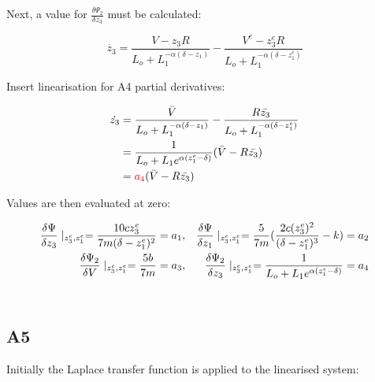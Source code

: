 \documentclass[a4paper,10pt,reqno]{amsart}
\numberwithin{equation}{section}
\begin{document}
\par Next, a value for $\frac{\delta\Psi_2}{\delta z_3}$ must be calculated:

\begin{equation}
    \dot{z_3}=\frac{V-z_3R}{L_o+L_1^{-\alpha(\delta-z_1)}}-\frac{V^e-z_3^eR}{L_o+L_1^{-\alpha(\delta-z_1^e)}}
\end{equation}

\par Insert linearisation for A4 partial derivatives:

\begin{align}
    \dot{z_3}&=\frac{\bar{V}}{L_o+L_1^{-\alpha(\delta-z_1)}}-\frac{R\bar{z_3}}{L_o+L_1^{-\alpha(\delta-z_1^e)}}
    \notag\\
    &=\frac{1}{L_o+L_1e^{\alpha(z_1^e-\delta)}}(\bar{V}-R\bar{z_3})
    \notag\\
    &=\color{red}a_4\color{black}(\bar{V}-R\bar{z_3})
\end{align}

\par Values are then evaluated at zero:

\begin{align} %
    \frac{\delta\Psi}{\delta z_3}\mid_{z_3^e,z_1^e}=\frac{10cz_3^e}{7m(\delta-z_1^e)^2}=a_1,
    &&
    \frac{\delta\Psi}{\delta z_1}\mid_{z_3^e,z_1^e}=\frac{5}{7m}(\frac{2c(z_3^e)^2}{(\delta-z_1^e)^3}-k)=a_2
    \notag\\
    \frac{\delta\Psi_2}{\delta V}\mid_{z_3^e,z_1^e}=\frac{5b}{7m}=a_3,
    &&
    \frac{\delta\Psi_2}{\delta z_3}\mid_{z_3^e,z_1^e}=\frac{1}{L_o+L_1e^{\alpha(z_1^e-\delta)}}=a_4
    \label{eqn:a_4}
\end{align}
\\

\subsection{A5}\label{sec:A5} 

\par Initially the Laplace transfer function is applied to the linearised system:
\end{document}

